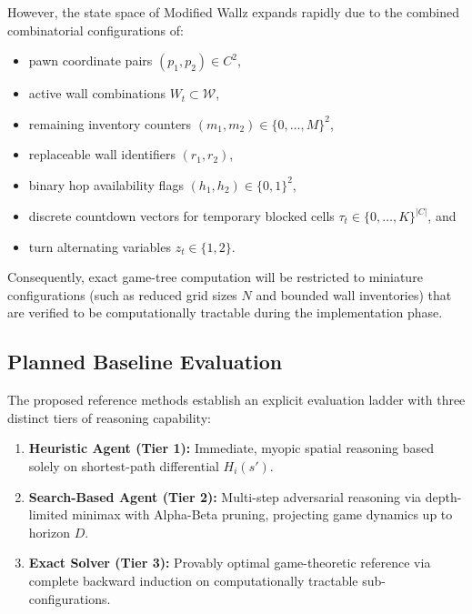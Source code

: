 \documentclass{article}
\begin{document}
However, the state space of Modified Wallz expands rapidly due to the combined combinatorial configurations of:
\begin{itemize}
    \item pawn coordinate pairs $(p_1, p_2) \in C^2$,
    \item active wall combinations $W_t \subset \mathcal{W}$,
    \item remaining inventory counters $(m_1, m_2) \in \{0, \dots, M\}^2$,
    \item replaceable wall identifiers $(r_1, r_2)$,
    \item binary hop availability flags $(h_1, h_2) \in \{0, 1\}^2$,
    \item discrete countdown vectors for temporary blocked cells $\tau_t \in \{0, \dots, K\}^{|C|}$, and
    \item turn alternating variables $z_t \in \{1, 2\}$.
\end{itemize}
Consequently, exact game-tree computation will be restricted to miniature configurations (such as reduced grid sizes $N$ and bounded wall inventories) that are verified to be computationally tractable during the implementation phase.

\subsection{Planned Baseline Evaluation}
\label{subsec:comparison_protocol}

The proposed reference methods establish an explicit evaluation ladder with three distinct tiers of reasoning capability:
\begin{enumerate}
    \item \textbf{Heuristic Agent (Tier 1):} Immediate, myopic spatial reasoning based solely on shortest-path differential $H_i(s')$.
    \item \textbf{Search-Based Agent (Tier 2):} Multi-step adversarial reasoning via depth-limited minimax with Alpha-Beta pruning, projecting game dynamics up to horizon $D$.
    \item \textbf{Exact Solver (Tier 3):} Provably optimal game-theoretic reference via complete backward induction on computationally tractable sub-configurations.
\end{enumerate}
\end{document}
